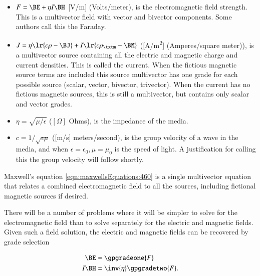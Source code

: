 \begin{itemize}
\item \( F = \BE + \eta I \BH \) [\si{V/m}] (Volts/meter), is the electromagnetic field strength.
This is a multivector field with vector and bivector components.  Some authors call this the Faraday.
\item \( J = \eta \lr{ c \rho - \BJ } + I \lr{ c \rho_\txtm - \BM } \) ([\si{A/m^2}] (Amperes/square meter)),
is a multivector source containing all the electric and magnetic charge and current densities.  This is called the current.
When the fictious magnetic source terms are included this source multivector has one grade for each possible source (scalar, vector, bivector, trivector).  When the current has no fictious magnetic sources, this is still a multivector, but contains only scalar and vector grades.
\item \( \eta = \sqrt{\mu/\epsilon} \) (\( [\Omega] \) Ohms), is the impedance of the media.
\item \( c = 1/\sqrt{\epsilon\mu} \) ([\si{m/s}] meters/second), is the group velocity of a wave in the media, and when \( \epsilon = \epsilon_0, \mu = \mu_0 \) is the speed of light.
A justification for calling this the group velocity will follow shortly.
\end{itemize}

Maxwell's equation \cref{eqn:maxwellsEquations:460} is a
single multivector equation that relates a combined electromagnetic field to all the sources, including fictional magnetic sources if desired.

There will be a number of problems where it will be simpler to solve for the electromagnetic field than to solve separately for the electric and magnetic fields.
Given such a field solution, the electric and magnetic fields can be recovered by grade selection

\begin{dmath}\label{eqn:isotropicMaxwells:480}
\begin{aligned}
\BE &= \gpgradeone{F} \\
I \BH &= \inv{\eta} \gpgradetwo{F}.
\end{aligned}
\end{dmath}
